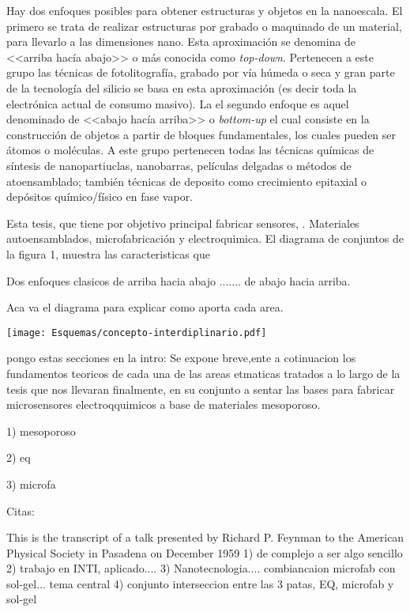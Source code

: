Hay dos enfoques posibles para obtener estructuras y objetos en la nanoescala. El primero se trata de realizar estructuras por grabado o maquinado de un material, para llevarlo a las dimensiones nano. Esta aproximación se denomina de <<arriba hacía abajo>> o más conocida como \textit{top-down}. Pertenecen a este grupo las técnicas de fotolitografía, grabado por vía húmeda o seca y gran parte de la tecnología del silicio se basa en esta aproximación (es decir toda la electrónica actual de consumo masivo). La el segundo enfoque es aquel denominado de <<abajo hacía arriba>> o \textit{bottom-up} el cual consiste en la construcción de objetos a partir de bloques fundamentales, los cuales pueden ser átomos o moléculas. A este grupo pertenecen todas las técnicas químicas de síntesis de nanopartiuclas, nanobarras, películas delgadas o métodos de atoensamblado; también técnicas de deposito como crecimiento epitaxial o depósitos químico/físico en fase vapor.

Esta tesis, que tiene por objetivo principal fabricar sensores, . Materiales autoensamblados, microfabricación y electroquimica. 
El diagrama de conjuntos de la figura 1, muestra las caracteristicas que 

Dos enfoques clasicos de arriba hacia abajo ....... de abajo hacia arriba.

Aca va el diagrama para explicar como aporta cada area.


\begin{center}
	\texttt{[image: Esquemas/concepto-interdiplinario.pdf]}
\end{center}

 
pongo estas secciones en la intro:
Se expone breve,ente a cotinuacion los fundamentos teoricos de cada una de las areas etmaticas tratados a lo largo de la tesis que nos llevaran finalmente, en su conjunto a sentar las bases para fabricar microsensores electroqquimicos a base de materiales mesoporoso.

1) mesoporoso

2) eq

3) microfa

Citas:


This is the transcript of a talk presented by Richard P. Feynman to the American Physical Society
in Pasadena on December 1959
1) de complejo a ser algo sencillo \\
2) trabajo en INTI, aplicado....
3) Nanotecnologia.... combiancaion microfab con sol-gel... tema central
4) conjunto interseccion entre las 3 patas, EQ, microfab y sol-gel

